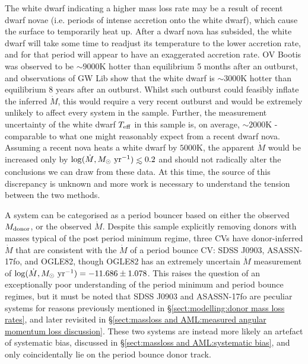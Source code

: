 The white dwarf indicating a higher mass loss rate may be a result of recent dwarf novae (i.e. periods of intense accretion onto the white dwarf), which cause the surface to temporarily heat up. After a dwarf nova has subsided, the white dwarf will take some time to readjust its temperature to the lower accretion rate, and for that period will appear to have an exaggerated accretion rate.
OV Bootis \citep{Schwope2021} was observed to be $\sim 9000$K hotter than equilibrium 5 months after an outburst, and observations of GW Lib \citep{Szkody2016} show that the white dwarf is $\sim 3000$K hotter than equilibrium 8 years after an outburst.
Whilst such outburst could feasibly inflate the inferred $\dot M$, this would require a very recent outburst and would be extremely unlikely to affect every system in the sample. Further, the measurement uncertainty of the white dwarf $T_{\rm eff}$ in this sample is, on average, $\sim 2000$K - comparable to what one might reasonably expect from a recent dwarf nova. Assuming a recent nova heats a white dwarf by $5000$K, the apparent $\dot M$ would be increased only by $\log (\dot M, M_\odot\ {\rm yr}^{-1})\lesssim 0.2$ and should not radically alter the conclusions we can draw from these data.
At this time, the source of this discrepancy is unknown and more work is necessary to understand the tension between the two methods.

A system can be categorised as a period bouncer based on either the observed $M_{\rm donor}$, or the observed $\dot M$.
Despite this sample explicitly removing donors with masses typical of the post period minimum regime, three CVs have donor-inferred $\dot M$ that are consistent with the $\dot M$ of a period bounce CV: SDSS J0903, ASASSN-17fo, and OGLE82, though OGLE82 has an extremely uncertain $\dot M$ measurement of $\log (\dot M, M_\odot\ {\rm yr}^{-1}) = -11.686 \pm 1.078$.
This raises the question of an exceptionally poor understanding of the period minimum and period bounce regimes, but it must be noted that SDSS J0903 and ASASSN-17fo are peculiar systems for reasons previously mentioned in \S\ref{sect:modelling:donor mass loss rates}, and later revisited in \S\ref{sect:massloss and AML:measured angular momentum loss discussion}.
These two systems are instead more likely an artefact of systematic bias, discussed in \S\ref{sect:massloss and AML:systematic bias}, and only coincidentally lie on the period bounce donor track.

